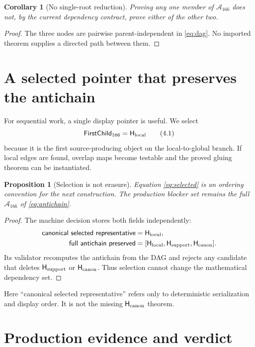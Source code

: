 \documentclass[11pt]{article}
\newtheorem{proposition}[theorem]{Proposition}
\newtheorem{corollary}[theorem]{Corollary}
\theoremstyle{definition}
\theoremstyle{remark}
\newcommand{\Hlocal}{\mathsf H_{\rm local}}
\newcommand{\Hsupport}{\mathsf H_{\rm support}}
\newcommand{\Hcanon}{\mathsf H_{\rm canon}}
\begin{document}
\begin{corollary}[No single-root reduction]\label{cor:no-single}
Proving any one member of \(\mathcal A_{166}\) does not, by the
current dependency contract, prove either of the other two.
\end{corollary}

\begin{proof}
The three nodes are pairwise parent-independent in
\eqref{eq:dag}.  No imported theorem supplies a directed path between
them.
\end{proof}

\section{A selected pointer that preserves the antichain}

For sequential work, a single display pointer is useful.  We select
\[
 \mathsf{FirstChild}_{166}=\Hlocal
 \tag{4.1}\label{eq:selected}
\]
because it is the first source-producing object on the
local-to-global branch.  If local edges are found, overlap maps become
testable and the proved gluing theorem can be instantiated.

\begin{proposition}[Selection is not erasure]\label{prop:selection}
Equation \eqref{eq:selected} is an ordering convention for the next
construction.  The production blocker set remains the full
\(\mathcal A_{166}\) of \cref{eq:antichain}.
\end{proposition}

\begin{proof}
The machine decision stores both fields independently:
\[
\begin{split}
\mathsf{canonical\ selected\ representative}&=\Hlocal,\\
\mathsf{full\ antichain\ preserved}
 &= [\Hlocal,\Hsupport,\Hcanon].
\end{split}
\]
Its validator recomputes the antichain from the DAG and rejects any
candidate that deletes \(\Hsupport\) or \(\Hcanon\).  Thus selection
cannot change the mathematical dependency set.
\end{proof}

Here ``canonical selected representative'' refers only to deterministic
serialization and display order.  It is not the missing
\(\Hcanon\) theorem.

\section{Production evidence and verdict}
\end{document}
